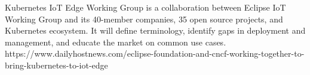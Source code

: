{%

Kubernetes IoT Edge Working Group is a collaboration between Eclipse IoT Working Group and its 40-member companies, 35 open source projects, and Kubernetes ecosystem. It will define terminology, identify gaps in deployment and management, and educate the market on common use cases.
https://www.dailyhostnews.com/eclipse-foundation-and-cncf-working-together-to-bring-kubernetes-to-iot-edge
}
